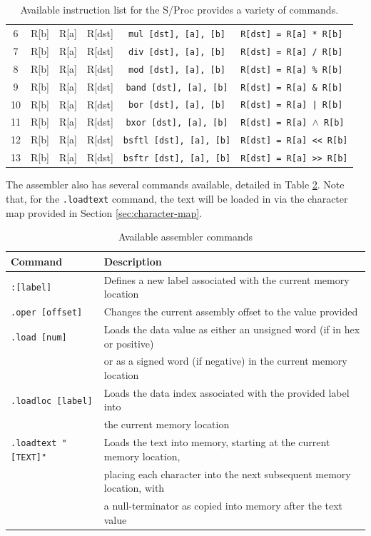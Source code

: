 \documentclass{article}
\begin{document}
\begin{table}[h!]
\begin{footnotesize}
\begin{tabular}{cccc|c|l}
			6 & R[b] & R[a] & R[dst] & \texttt{mul [dst], [a], [b]} & \texttt{R[dst] = R[a] * R[b]} \\
			7 & R[b] & R[a] & R[dst] & \texttt{div [dst], [a], [b]} & \texttt{R[dst] = R[a] / R[b]} \\
			8 & R[b] & R[a] & R[dst] & \texttt{mod [dst], [a], [b]} & \texttt{R[dst] = R[a] \% R[b]} \\
			9 & R[b] & R[a] & R[dst] & \texttt{band [dst], [a], [b]} & \texttt{R[dst] = R[a] \& R[b]} \\
			10 & R[b] & R[a] & R[dst] & \texttt{bor [dst], [a], [b]} & \texttt{R[dst] = R[a] | R[b]} \\
			11 & R[b] & R[a] & R[dst] & \texttt{bxor [dst], [a], [b]} & \texttt{R[dst] = R[a] $\wedge$ R[b]} \\
			12 & R[b] & R[a] & R[dst] & \texttt{bsftl [dst], [a], [b]} & \texttt{R[dst] = R[a] << R[b]} \\
			13 & R[b] & R[a] & R[dst] & \texttt{bsftr [dst], [a], [b]} & \texttt{R[dst] = R[a] >> R[b]} \\
			\hline
		\end{tabular}
	\end{footnotesize}
	\caption{Available instruction list for the S/Proc provides a variety of commands.}
	\label{table:instruction-table}
\end{table}

\pagebreak

The assembler also has several commands available, detailed in Table \ref{table:assembler-commands}. Note that, for the \texttt{.loadtext} command, the text will be loaded in via the character map provided in Section \ref{sec:character-map}.

\begin{table}[h!]
	\centering
	\begin{tabular}{l|l}
		\hline
		Command & Description \\
		\hline
		\texttt{:[label]} & Defines a new label associated with the current memory location \\
		\texttt{.oper [offset]} & Changes the current assembly offset to the value provided \\
		\texttt{.load [num]} & Loads the data value as either an unsigned word (if in hex or positive)\\
		& or as a signed word (if negative) in the current memory location \\
		\texttt{.loadloc [label]} & Loads the data index associated with the provided label into \\
		& the current memory location \\
		\texttt{.loadtext "[TEXT]"} & Loads the text into memory, starting at the current memory location, \\
		& placing each character into the next subsequent memory location, with \\
		& a null-terminator as copied into memory after the text value \\
		\hline
	\end{tabular}
	\caption{Available assembler commands}
	\label{table:assembler-commands}
\end{table}
\end{document}
